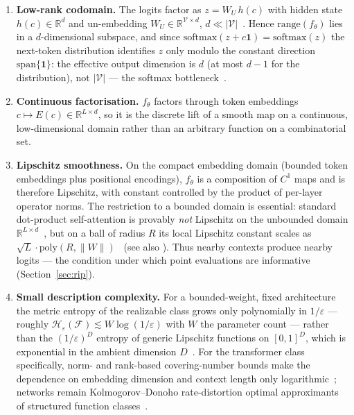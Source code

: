\documentclass[11pt,a4paper]{article}
\theoremstyle{definition}
\newcommand{\Voc}{\mathcal{V}}
\newcommand{\Fclass}{\mathcal{F}}
\newcommand{\RR}{\mathbb{R}}
\newcommand{\Hent}{\mathcal{H}}
\begin{document}
\begin{enumerate}[label=\textbf{(P\arabic*)},leftmargin=*]
  \item \textbf{Low-rank codomain.} The logits factor as $z = W_U\,h(c)$ with
  hidden state $h(c)\in\RR^{d}$ and un-embedding $W_U\in\RR^{\Voc\times d}$,
  $d \ll |\Voc|$~\citep{vaswani2017attention}. Hence $\mathrm{range}(f_\theta)$
  lies in a $d$-dimensional subspace, and since $\mathrm{softmax}(z+c\mathbf 1)=\mathrm{softmax}(z)$
  the next-token distribution identifies $z$ only modulo the constant direction
  $\mathrm{span}\{\mathbf 1\}$: the effective output dimension is $d$ (at most $d-1$ for the
  distribution), not $|\Voc|$ --- the softmax bottleneck~\citep{yang2018softmax}.
  \item \textbf{Continuous factorisation.} $f_\theta$ factors through token
  embeddings $c \mapsto E(c)\in\RR^{L\times d}$, so it is the discrete lift of a
  smooth map on a continuous, low-dimensional domain rather than an arbitrary
  function on a combinatorial set.
  \item \textbf{Lipschitz smoothness.} On the compact embedding domain (bounded
  token embeddings plus positional encodings), $f_\theta$ is a composition of
  $C^1$ maps and is therefore Lipschitz, with constant controlled by the product
  of per-layer operator norms. The restriction to a bounded domain is essential:
  standard dot-product self-attention is provably \emph{not} Lipschitz on the
  unbounded domain $\RR^{L\times d}$~\citep[Thm.~3.1]{kim2021lipschitz}, but on a
  ball of radius $R$ its local Lipschitz constant scales as
  $\sqrt{L}\cdot\mathrm{poly}(R,\|W\|)$~\citep[Thm.~3.3]{castin2024smooth} (see
  also \citealp{vuckovic2021regularity}). Thus nearby contexts produce nearby
  logits --- the condition under which point evaluations are informative
  (Section~\ref{sec:rip}).
  \item \textbf{Small description complexity.} For a bounded-weight, fixed
  architecture the metric entropy of the realizable class grows only
  polynomially in $1/\varepsilon$ --- roughly
  $\Hent_\varepsilon(\Fclass)\lesssim W\log(1/\varepsilon)$ with $W$ the parameter
  count --- rather than the $(1/\varepsilon)^{D}$ entropy of generic Lipschitz
  functions on $[0,1]^{D}$, which is exponential in the ambient dimension
  $D$~\citep{kolmogorov1959entropy,anthonybartlett1999}. For the transformer
  class specifically, norm- and rank-based covering-number bounds make the
  dependence on embedding dimension and context length only
  logarithmic~\citep{edelman2022inductive,trauger2024sequence}; networks remain
  Kolmogorov--Donoho rate-distortion optimal approximants of structured function
  classes~\citep{elbraechter2021dnn}.
\end{enumerate}
\end{document}

